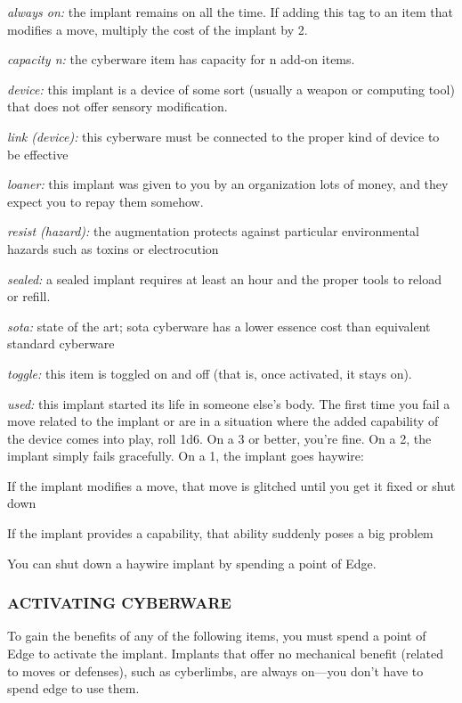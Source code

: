 \documentclass[oneside,10pt]{article}
\begin{document}
\begin{multicols}{2}
\begin{dent}
    \textit{always on:} the implant remains on all the time. If adding
    this tag to an item that modifies a move, multiply the cost of the
    implant by 2.

    \textit{capacity n:} the cyberware item has capacity for n add-on
    items.

    \textit{device:} this implant is a device of some sort (usually a
    weapon or computing tool) that does not offer sensory
    modification.

    \textit{link (device):} this cyberware must be connected to the
    proper kind of device to be effective

    \textit{loaner:} this implant was given to you by an organization
    lots of money, and they expect you to repay them somehow.

    \textit{resist (hazard):} the augmentation protects against
    particular environmental hazards such as toxins or electrocution

    \textit{sealed:} a sealed implant requires at least an hour and
    the proper tools to reload or refill.

    \textit{sota:} state of the art; sota cyberware has a lower
    essence cost than equivalent standard cyberware

    \textit{toggle:} this item is toggled on and off (that is, once
    activated, it stays on).

    \textit{used:} this implant started its life in someone else’s
    body.  The first time you fail a move related to the implant or
    are in a situation where the added capability of the device comes
    into play, roll 1d6. On a 3 or better, you’re fine. On a 2, the
    implant simply fails gracefully. On a 1, the implant goes haywire:

    \begin{dent}
      \tcirc{} If the implant modifies a move, that move is glitched
      until you get it fixed or shut down

      \tcirc{} If the implant provides a capability, that ability
      suddenly poses a big problem

      \tcirc{} You can shut down a haywire implant by spending a point
      of Edge.
    \end{dent}
  \end{dent}

  \subsubsection{ACTIVATING CYBERWARE}
  To gain the benefits of any of the following items, you must spend a
  point of Edge to activate the implant. Implants that offer no
  mechanical benefit (related to moves or defenses), such as
  cyberlimbs, are always on—you don’t have to spend edge to use them.


\end{multicols}
\end{document}
